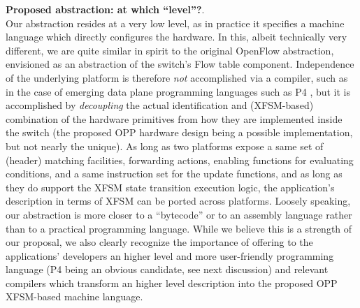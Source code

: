 \documentclass{sig-alternate}
\begin{document}
\vspace{3pt} \noindent \textbf{Proposed abstraction: at which ``level''?}. \\
Our abstraction resides at a very low level, as in practice it specifies a machine language which directly configures the hardware. In this, albeit technically very different, we are quite similar in spirit to the original OpenFlow abstraction, envisioned as an abstraction of the switch's Flow table component. Independence of the underlying platform is therefore {\em not} accomplished via a compiler, such as in the case of emerging data plane programming languages such as P4 \cite{Jos15}, but it is accomplished by {\em decoupling} the actual identification and (XFSM-based) combination of the hardware primitives from how they are implemented inside the switch (the proposed OPP hardware design being a possible implementation, but not nearly the unique). As long as two platforms expose a same set of (header) matching facilities, forwarding actions, enabling functions for evaluating conditions, and a same instruction set for the update functions, and as long as they do support the XFSM state transition execution logic, the application's description in terms of XFSM can be ported across platforms. Loosely speaking, our abstraction is more closer to a ``bytecode'' or to an assembly language rather than to a practical programming language. While we believe this is a strength of our proposal, we also clearly recognize the importance of offering to the applications' developers an higher level and more user-friendly programming language (P4 being an obvious candidate, see next discussion) and relevant compilers which transform an higher level description into the proposed OPP XFSM-based machine language. 
\end{document}
